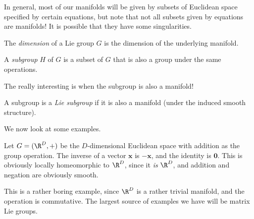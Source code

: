 \documentclass[a4paper]{article}
\begin{document}
In general, most of our manifolds will be given by subsets of Euclidean space specified by certain equations, but note that not all subsets given by equations are manifolds! It is possible that they have some singularities.

\begin{defi}
  The \emph{dimension} of a Lie group $G$ is the dimension of the underlying manifold.
\end{defi}

\begin{defi}[Subgroup]
  A \emph{subgroup} $H$ of $G$ is a subset of $G$ that is also a group under the same operations.
\end{defi}

The really interesting is when the subgroup is also a manifold!
\begin{defi}
  A subgroup is a \emph{Lie subgroup} if it is also a manifold (under the induced smooth structure).
\end{defi}

%
%

We now look at some examples.
\begin{eg}
  Let $G = (\R^D, +)$ be the $D$-dimensional Euclidean space with addition as the group operation. The inverse of a vector $\mathbf{x}$ is $-\mathbf{x}$, and the identity is $\mathbf{0}$. This is obviously locally homeomorphic to $\R^D$, since it \emph{is} $\R^D$, and addition and negation are obviously smooth.
\end{eg}

This is a rather boring example, since $\R^D$ is a rather trivial manifold, and the operation is commutative. The largest source of examples we have will be matrix Lie groups.
\end{document}
